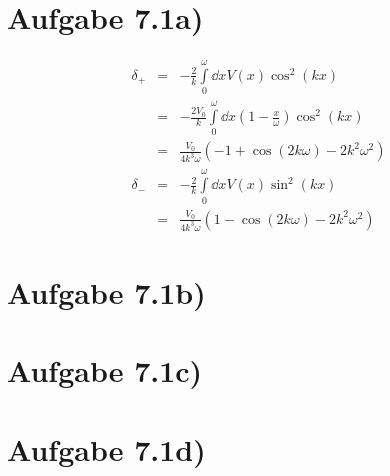\section*{Aufgabe 7.1a)}
\begin{eqnarray}
δ_+ &=& -\frac{2}{k}\int\limits_0^ω\dd{x}V(x)\cos^2(kx)\\
&=& -\frac{2 V_0}{k}\int\limits_0^ω\dd{x}(1-\frac{x}{ω})\cos^2(kx)\\
&=& \frac{V_0}{4k^3 ω} \left(-1 + \cos(2kω) - 2k^2 ω^2\right)\\
δ_- &=& -\frac{2}{k}\int\limits_0^ω\dd{x}V(x)\sin^2(kx)\\
&=& \frac{V_0}{4k^3 ω} \left(1 - \cos(2kω) - 2k^2 ω^2\right)
\end{eqnarray}

\section*{Aufgabe 7.1b)}
\section*{Aufgabe 7.1c)}
\section*{Aufgabe 7.1d)}